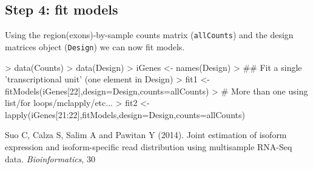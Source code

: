 \documentclass[10pt]{article}
\newcommand{\Robject}[1]{{\texttt{#1}}}
\begin{document}
\subsection{Step 4: fit models}
\label{sec:fit}

Using the region(exons)-by-sample counts matrix (\Robject{allCounts}) and the
design matrices object (\Robject{Design}) we can now fit models.

\begin{Schunk}
\begin{Sinput}
> data(Counts)
> data(Design)
> iGenes <- names(Design)
> ## Fit a single 'transcriptional unit' (one element in Design)
> fit1 <- fitModels(iGenes[22],design=Design,counts=allCounts)
> # More than one using list/for loops/mclapply/etc...
> fit2 <- lapply(iGenes[21:22],fitModels,design=Design,counts=allCounts)
\end{Sinput}
\end{Schunk}


\begin{thebibliography}{1}
 Suo C, Calza S, Salim A and Pawitan Y (2014). Joint estimation of
  isoform expression and isoform-specific read distribution using multisample
  RNA-Seq data. \emph{Bioinformatics}, 30
\end{thebibliography}
\end{document}
